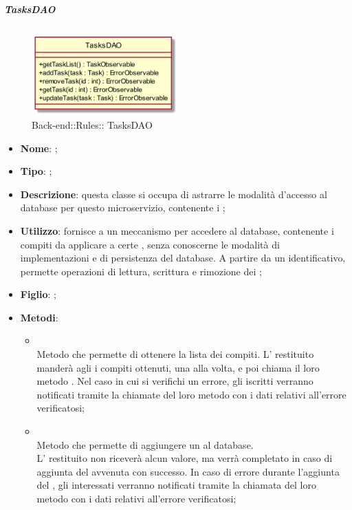 \hypertarget{ TasksDAO_label}{\subparagraph{ TasksDAO}}
\begin{figure}[h]
	\centering
	\includegraphics[width=0.50\textwidth,height=\textheight,keepaspectratio]{images/ClassTasksDAO.png}
	\caption{Back-end::Rules:: TasksDAO}
\end{figure}
\begin{itemize}
	\item \textbf{Nome}: ;
	\item \textbf{Tipo}: ;
	\item \textbf{Descrizione}: questa classe si occupa di astrarre le modalità d'accesso al database per questo microservizio, contenente i ;
	\item \textbf{Utilizzo}: fornisce a  un meccanismo per accedere al database, contenente i compiti da applicare a certe , senza conoscerne le modalità di implementazioni e di persistenza del database. A partire da un identificativo, permette operazioni di lettura, scrittura e rimozione dei ;
	\item \textbf{Figlio}: ;
	\item \textbf{Metodi}:
	\begin{itemize}
		\item[]  \\		Metodo che permette di ottenere la lista dei compiti. L' restituito manderà agli  i compiti ottenuti, una alla volta, e poi chiama il loro metodo . Nel caso in cui si verifichi un errore, gli  iscritti verranno notificati tramite la chiamate del loro metodo  con i dati relativi all'errore verificatosi;\\
		\item[]  \\		Metodo che permette di aggiungere un  al database. \\ L' restituito non riceverà alcun valore, ma verrà completato in caso di aggiunta del  avvenuta con successo. In caso di errore durante l'aggiunta del , gli  interessati verranno notificati tramite la chiamata del loro metodo  con i dati relativi all'errore verificatosi;\\

\end{itemize}
\end{itemize}
